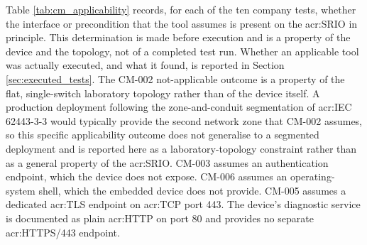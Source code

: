 Table \ref{tab:cm_applicability} records, for each of the ten company tests, whether the interface or precondition that the tool assumes is present on the \gls{acr:SRIO} in principle. This determination is made before execution and is a property of the device and the topology, not of a completed test run. Whether an applicable tool was actually executed, and what it found, is reported in Section \ref{sec:executed_tests}. The CM-002 not-applicable outcome is a property of the flat, single-switch laboratory topology rather than of the device itself. A production deployment following the zone-and-conduit segmentation of \gls{acr:IEC} 62443-3-3 would typically provide the second network zone that CM-002 assumes, so this specific applicability outcome does not generalise to a segmented deployment and is reported here as a laboratory-topology constraint rather than as a general property of the \gls{acr:SRIO}. CM-003 assumes an authentication endpoint, which the device does not expose. CM-006 assumes an operating-system shell, which the embedded device does not provide. CM-005 assumes a dedicated \gls{acr:TLS} endpoint on \gls{acr:TCP} port 443. The device's diagnostic service is documented as plain \gls{acr:HTTP} on port 80 and provides no separate \gls{acr:HTTPS}/443 endpoint.


